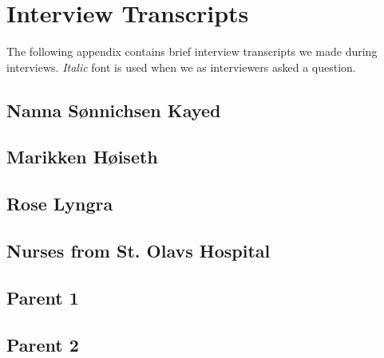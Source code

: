 \chapter{Interview Transcripts}

\label{app:interview-transcripts}

The following appendix contains brief interview transcripts we made during interviews. \emph{Italic} font is used when we as interviewers asked a question. 

\section{Nanna S\o nnichsen Kayed}
\label{sec:psychinterview}

\clearpage

\section{Marikken H\o iseth}
\label{sec:marikkeninterview}

\clearpage

\section{Rose Lyngra}
\label{sec:roseinterview}

\clearpage{}

\section{Nurses from St. Olavs Hospital}
\label{sec:nursesinterview}

\clearpage{}

\section{Parent 1}
\label{sec:parent1interview}

\clearpage{}

\section{Parent 2}
\label{sec:parent2interview}

\clearpage{}